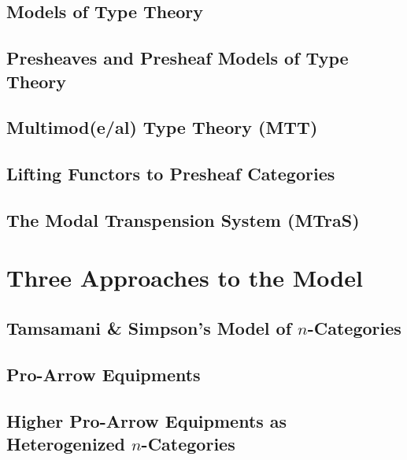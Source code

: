 \documentclass{lmcs} %
\theoremstyle{plain}\newtheorem{satz}[thm]{Satz} %
\theoremstyle{plain}
\theoremstyle{definition}
\begin{document}
\subsection{Models of Type Theory}

\subsection{Presheaves and Presheaf Models of Type Theory} \label{sec:pshmodel}

\subsection{Multimod(e/al) Type Theory (MTT)}

\subsection{Lifting Functors to Presheaf Categories}

\subsection{The Modal Transpension System (MTraS)}

\section{Three Approaches to the Model}

\subsection{Tamsamani \& Simpson's Model of $n$-Categories}

\subsection{Pro-Arrow Equipments}

\subsection{Higher Pro-Arrow Equipments as Heterogenized $n$-Categories}
\end{document}
